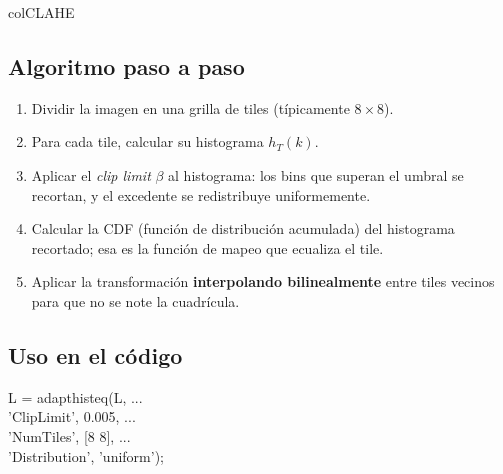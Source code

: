 \documentclass[11pt,a4paper]{article}
\begin{document}
\begin{keybox}{colCLAHE}
\subsection*{Algoritmo paso a paso}

\begin{enumerate}
    \item Dividir la imagen en una grilla de tiles (típicamente \(8\times 8\)).
    \item Para cada tile, calcular su histograma \(h_T(k)\).
    \item Aplicar el \emph{clip limit} \(\beta\) al histograma: los bins que
          superan el umbral se recortan, y el excedente se redistribuye uniformemente.
    \item Calcular la CDF (función de distribución acumulada) del histograma
          recortado; esa es la función de mapeo que ecualiza el tile.
    \item Aplicar la transformación \textbf{interpolando bilinealmente} entre
          tiles vecinos para que no se note la cuadrícula.
\end{enumerate}

\subsection*{Uso en el código}

\begin{codebox}
L = adapthisteq(L, ... \\
\quad 'ClipLimit',    0.005, ... \\
\quad 'NumTiles',     [8 8], ... \\
\quad 'Distribution', 'uniform');
\end{codebox}

\end{keybox}

\end{document}
